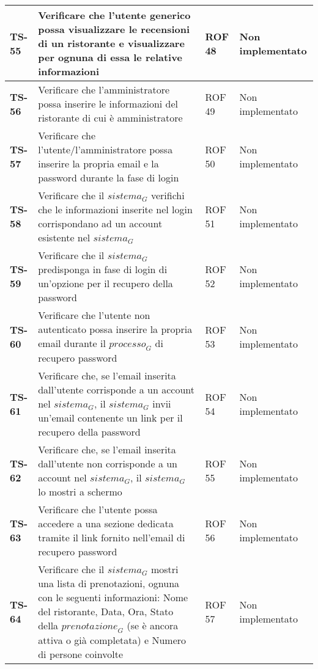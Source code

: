 \begin{longtable}{|>{\centering\arraybackslash}p{1.5cm}|p{9.8cm}|p{2cm}|p{3.5cm}|}
    \hline
    \rowcolor{gray!10}
    \textbf{TS-55} & Verificare che l'utente generico possa visualizzare le recensioni di un ristorante e visualizzare per ognuna di essa le relative informazioni & ROF 48 & Non implementato \\ 
    \hline
    \rowcolor{gray!10}
    \textbf{TS-56} & Verificare che l'amministratore possa inserire le informazioni del ristorante di cui è amministratore & ROF 49 & Non implementato \\
    \hline
    \rowcolor{gray!10}
    \textbf{TS-57} & Verificare che l'utente/l'amministratore possa inserire la propria email e la password durante la fase di login & ROF 50 & Non implementato \\ 
    \hline
    \rowcolor{gray!10}
    \textbf{TS-58} & Verificare che il $\textit{sistema}_G$ verifichi che le informazioni inserite nel login corrispondano ad un account esistente nel $\textit{sistema}_G$ & ROF 51 & Non implementato \\ 
    \hline
    \rowcolor{gray!10}
    \textbf{TS-59} & Verificare che il $\textit{sistema}_G$ predisponga in fase di login di un'opzione per il recupero della password & ROF 52 & Non implementato \\ 
    \hline
    \rowcolor{gray!10}
    \textbf{TS-60} & Verificare che l'utente non autenticato possa inserire la propria email durante il $\textit{processo}_G$ di recupero password & ROF 53 & Non implementato \\ 
    \hline
    \rowcolor{gray!10}
    \textbf{TS-61} & Verificare che, se l'email inserita dall'utente corrisponde a un account nel $\textit{sistema}_G$, il $\textit{sistema}_G$ invii un'email contenente un link per il recupero della password & ROF 54 & Non implementato \\
    \hline
    \rowcolor{gray!10}
    \textbf{TS-62} & Verificare che, se l'email inserita dall'utente non corrisponde a un account nel $\textit{sistema}_G$, il $\textit{sistema}_G$ lo mostri a schermo & ROF 55 & Non implementato \\ 
    \hline
    \rowcolor{gray!10}
    \textbf{TS-63} & Verificare che l'utente possa accedere a una sezione dedicata tramite il link fornito nell'email di recupero password & ROF 56 & Non implementato \\ 
    \hline
    \rowcolor{gray!10}
    \textbf{TS-64} & Verificare che il $\textit{sistema}_G$ mostri una lista di prenotazioni, ognuna con le seguenti informazioni:
    Nome del ristorante, Data, Ora, Stato della $\textit{prenotazione}_G$ (se è ancora attiva o già completata) e Numero di persone coinvolte & ROF 57 & Non implementato \\

\end{longtable}
